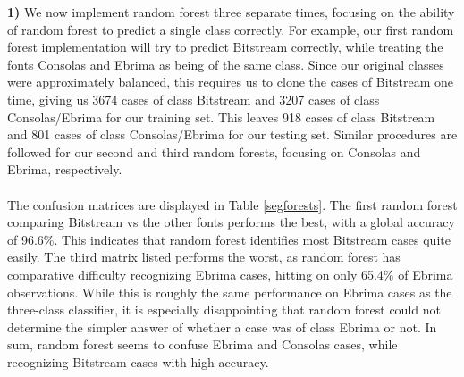 \documentclass{homework}
\begin{document}
\question %
\textbf{1)} We now implement random forest three separate times, focusing on the ability of random forest to predict a single class correctly. For example, our first random forest implementation will try to predict Bitstream correctly, while treating the fonts Consolas and Ebrima as being of the same class. Since our original classes were approximately balanced, this requires us to clone the cases of Bitstream one time, giving us 3674 cases of class Bitstream and 3207 cases of class Consolas/Ebrima for our training set. This leaves 918 cases of class Bitstream and 801 cases of class Consolas/Ebrima for our testing set. Similar procedures are followed for our second and third random forests, focusing on Consolas and Ebrima, respectively.\\\\ The confusion matrices are displayed in Table \ref{segforests}. The first random forest comparing Bitstream vs the other fonts performs the best, with a global accuracy of 96.6\%. This indicates that random forest identifies most Bitstream cases quite easily. The third matrix listed performs the worst, as random forest has comparative difficulty recognizing Ebrima cases, hitting on only 65.4\% of Ebrima observations. While this is roughly the same performance on Ebrima cases as the three-class classifier, it is especially disappointing that random forest could not determine the simpler answer of whether a case was of class Ebrima or not. In sum, random forest seems to confuse Ebrima and Consolas cases, while recognizing Bitstream cases with high accuracy.

\begin{table}[H]
    \centering
    \\
        \\
    \caption{Confusion Matrices for Two-Class Testing Sets with 171 Tree Random Forest}
    \label{segforests}
\end{table}
\end{document}
